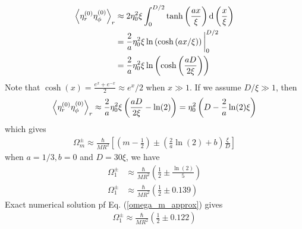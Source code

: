 \documentclass[aps,prl,preprint]{revtex4-2}
\begin{document}
\begin{align}
    \ev{\eta^{(0)}_r\eta^{(0)}_\phi}_r
     & \approx 2 \eta_0^2\xi
    \int_0^{D/2}
    \tanh\left(\frac{ax}{\xi}\right)
    \dd\left(\frac{x}{\xi}\right)                                                    \\
     & =\frac{2}{a}\eta_0^2\xi\ln\left(\cosh\left(ax/\xi\right)\right)\bigg|_0^{D/2} \\
     & =\frac{2}{a}\eta_0^2\xi\ln\left(\cosh\left(\frac{aD}{2\xi}\right)\right)
\end{align}
Note that $\cosh(x)=\frac{e^x+e^{-x}}{2}\approx e^x/2$ when $x\gg 1$.
If we assume $D/\xi\gg 1$, then
\begin{align}
    \ev{\eta^{(0)}_r\eta^{(0)}_\phi}_r
    \approx \frac{2}{a}\eta_0^2\xi\left(\frac{aD}{2\xi} - \ln(2)\right)
    = \eta_0^2\left(D - \frac{2}{a}\ln(2)\xi\right)
\end{align}
which gives
\begin{align}
    \Omega_m^\pm \approx \frac{\hbar}{MR^2}\left[\left(m-\frac{1}{2}\right)
        \pm\left(\frac{2}{a}\ln(2)+b\right)\frac{\xi}{D}\right]
\end{align}
when $a=1/3, b=0$ and $D=30\xi$, we have
\begin{align}
    \Omega_1^\pm & \approx \frac{\hbar}{MR^2}\left(\frac{1}{2}\pm\frac{\ln(2)}{5}\right) \\
    \Omega_1^\pm & \approx \frac{\hbar}{MR^2}\left(\frac{1}{2}\pm 0.139\right)
\end{align}
Exact numerical solution pf Eq. (\ref{omega_m_approx}) gives
\begin{align}
    \Omega_1^\pm \approx \frac{\hbar}{MR^2}\left(\frac{1}{2}\pm 0.122\right)
\end{align}
\end{document}
